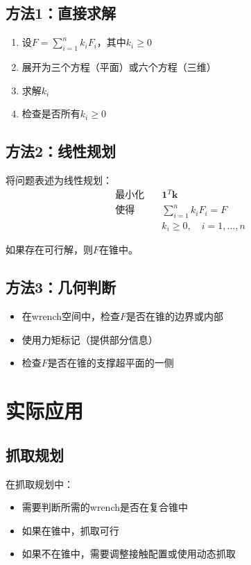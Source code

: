 \documentclass[12pt,a4paper]{article}
\begin{document}
\subsection{方法1：直接求解}

\begin{enumerate}
    \item 设$F = \sum_{i=1}^n k_i F_i$，其中$k_i \geq 0$
    \item 展开为三个方程（平面）或六个方程（三维）
    \item 求解$k_i$
    \item 检查是否所有$k_i \geq 0$
\end{enumerate}

\subsection{方法2：线性规划}

将问题表述为线性规划：
\begin{align}
\text{最小化} \quad & \mathbf{1}^T \mathbf{k} \\
\text{使得} \quad & \sum_{i=1}^n k_i F_i = F \\
& k_i \geq 0, \quad i = 1, \ldots, n
\end{align}

如果存在可行解，则$F$在锥中。

\subsection{方法3：几何判断}

\begin{itemize}
    \item 在wrench空间中，检查$F$是否在锥的边界或内部
    \item 使用力矩标记（提供部分信息）
    \item 检查$F$是否在锥的支撑超平面的一侧
\end{itemize}

\section{实际应用}

\subsection{抓取规划}

在抓取规划中：
\begin{itemize}
    \item 需要判断所需的wrench是否在复合锥中
    \item 如果在锥中，抓取可行
    \item 如果不在锥中，需要调整接触配置或使用动态抓取
\end{itemize}
\end{document}
